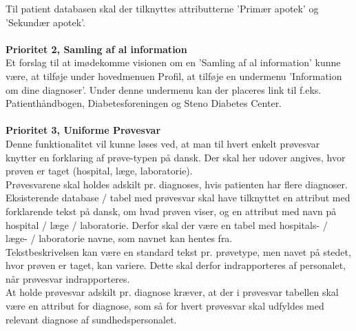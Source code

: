 Til patient databasen skal der tilknyttes attributterne 'Primær apotek' og 'Sekundær apotek'.
\\\\
\textbf{Prioritet 2, Samling af al information} \\
Et forslag til at imødekomme visionen om en 'Samling af al information' kunne være, at tilføje under hovedmenuen Profil, at tilføje en undermenu 'Information om dine diagnoser'. Under denne undermenu kan der placeres link til f.eks. Patienthåndbogen, Diabetesforeningen og Steno Diabetes Center.
\\\\ 
\textbf{Prioritet 3, Uniforme Prøvesvar} \\
Denne funktionalitet vil kunne løses ved, at man til hvert enkelt prøvesvar knytter en forklaring af prøve-typen på dansk. Der skal her udover angives, hvor prøven er taget (hospital, læge, laboratorie).\\
Prøvesvarene skal holdes adskilt pr. diagnoses, hvis patienten har flere diagnoser.\\
Eksisterende database / tabel med prøvesvar skal have tilknyttet en attribut med forklarende tekst på dansk, om hvad prøven viser, og en attribut med navn på hospital / læge / laboratorie. Derfor skal der være en tabel med hospitals- / læge- / laboratorie navne, som navnet kan hentes fra.\\ 
Tekstbeskrivelsen kan være en standard tekst pr. prøvetype, men navet på stedet, hvor prøven er taget, kan variere. Dette skal derfor indrapporteres af personalet, når prøvesvar indrapporteres. \\
At holde prøvesvar adskilt pr. diagnose kræver, at der i prøvesvar tabellen skal være en attribut for diagnose, som så for hvert prøvesvar skal udfyldes med relevant diagnose af sundhedspersonalet.\\

